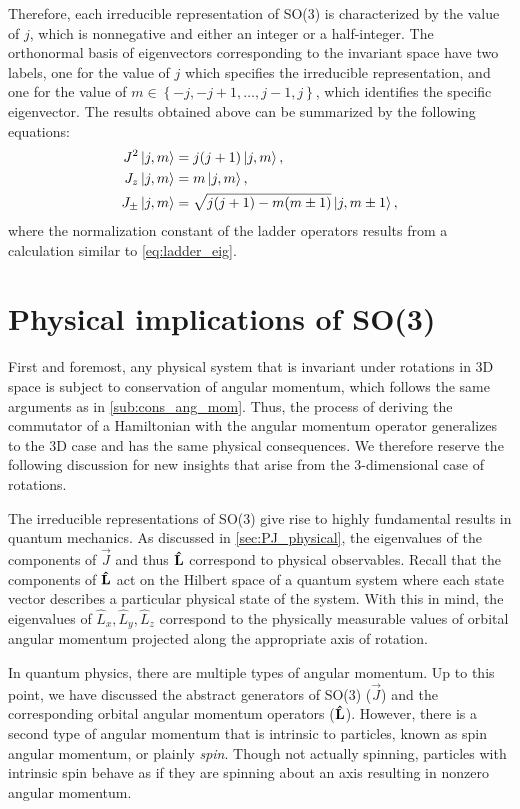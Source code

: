Therefore, each irreducible representation of SO(3) is characterized by the value of $j$, which is nonnegative and either an integer or a half-integer. The orthonormal basis of eigenvectors corresponding to the invariant space have two labels, one for the value of $j$ which specifies the irreducible representation, and one for the value of $m\in\left\{ -j,-j+1,\dots,j-1,j \right\}$, which identifies the specific eigenvector. The results obtained above can be summarized by the following equations:
\begin{align}
    J^2\ket{j,m} &= j(j+1)\ket{j,m}, \\
    J_z\ket{j,m} &= m\ket{j,m}, \\
    J_\pm\ket{j,m} &= \sqrt{j(j+1)-m(m\pm 1)}\ket{j,m\pm 1},
\end{align}
where the normalization constant of the ladder operators results from a calculation similar to \cref{eq:ladder_eig}.

\section{Physical implications of SO(3)}\label{sec:phys_SO3}
First and foremost, any physical system that is invariant under rotations in 3D space is subject to conservation of angular momentum, which follows the same arguments as in \cref{sub:cons_ang_mom}. Thus, the process of deriving the commutator of a Hamiltonian with the angular momentum operator generalizes to the 3D case and has the same physical consequences.
We therefore reserve the following discussion for new insights that arise from the 3-dimensional case of rotations.

The irreducible representations of SO(3) give rise to highly fundamental results in quantum mechanics. As discussed in \cref{sec:PJ_physical}, the eigenvalues of the components of $\vec{J}$ and thus $\mathbf{\hat{L}}$ correspond to physical observables. Recall that the components of $\mathbf{\hat{L}}$ act on the Hilbert space of a quantum system where each state vector describes a particular physical state of the system. With this in mind, the eigenvalues of $\hat{L}_x, \hat{L}_y, \hat{L}_z$ correspond to the physically measurable values of orbital angular momentum projected along the appropriate axis of rotation.

In quantum physics, there are multiple types of angular momentum. Up to this point, we have discussed the abstract generators of SO(3) ($\vec{J}$) and the corresponding orbital angular momentum operators ($\mathbf{\hat{L}}$). However, there is a second type of angular momentum that is intrinsic to particles, known as spin angular momentum, or plainly \textit{spin}. Though not actually spinning, particles with intrinsic spin behave as if they are spinning about an axis resulting in nonzero angular momentum.

